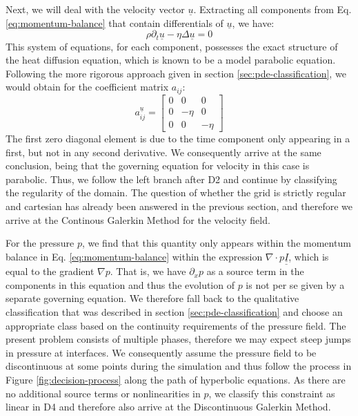 \documentclass[sn-mathphys,Numbered]{sn-jnl}%
\theoremstyle{thmstyleone}%
\theoremstyle{thmstyletwo}%
\theoremstyle{thmstylethree}%
\begin{document}
Next, we will deal with the velocity vector $\underline{u}$.
Extracting all components from Eq. \ref{eq:momentum-balance} that contain differentials of $\underline{u}$, we have:
\begin{equation}
    \rho \partial_t \underline{u} - \eta \Delta \underline{u} = 0
\end{equation}
This system of equations, for each component, possesses the exact structure of the heat diffusion equation, which is known to be a model parabolic equation.
Following the more rigorous approach given in section \ref{sec:pde-classification}, we would obtain for the coefficient matrix $a_{ij}$:
\begin{equation}
    a_{ij}^{\underline{u}} = \begin{bmatrix}
        0 & 0 & 0 \\
        0 & -\eta & 0 \\
        0 & 0 & -\eta
    \end{bmatrix}
\end{equation}
The first zero diagonal element is due to the time component only appearing in a first, but not in any second derivative.
We consequently arrive at the same conclusion, being that the governing equation for velocity in this case is parabolic.
Thus, we follow the left branch after D2 and continue by classifying the regularity of the domain.
The question of whether the grid is strictly regular and cartesian has already been answered in the previous section, and therefore we arrive at the Continous Galerkin Method for the velocity field.

For the pressure $p$, we find that this quantity only appears within the momentum balance in Eq. \ref{eq:momentum-balance} within the expression $\nabla \cdot p\underline{\underline{I}}$, which is equal to the gradient $\nabla p$.
That is, we have $\partial_x p$ as a source term in the components in this equation and thus the evolution of $p$ is not per se given by a separate governing equation.
We therefore fall back to the qualitative classification that was described in section \ref{sec:pde-classification} and choose an appropriate class based on the continuity requirements of the pressure field.
The present problem consists of multiple phases, therefore we may expect steep jumps in pressure at interfaces.
We consequently assume the pressure field to be discontinuous at some points during the simulation and thus follow the process in Figure \ref{fig:decision-process} along the path of hyperbolic equations.
As there are no additional source terms or nonlinearities in $p$, we classify this constraint as linear in D4 and therefore also arrive at the Discontinuous Galerkin Method.
\end{document}
